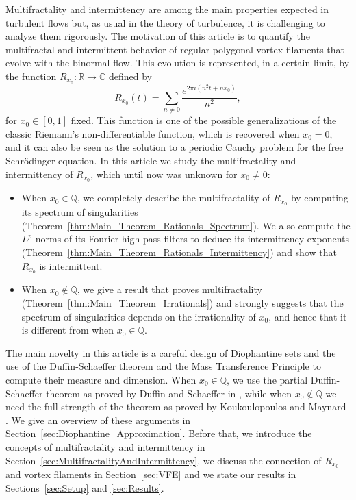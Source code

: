 \documentclass[11pt,reqno]{amsart}
\theoremstyle{definition}
\begin{document}
Multifractality and intermittency are among the main properties expected in turbulent flows
but, as usual in the theory of turbulence, it is challenging to analyze them rigorously. 
The motivation of this article is to quantify the multifractal and intermittent behavior of regular polygonal vortex filaments that evolve with the binormal flow.  
This evolution is represented, in a certain limit, by the function 
$R_{x_0}: \mathbb R \to \mathbb C$ defined by 
\begin{equation}\label{eq:R_x0}
R_{x_0}(t) = \sum_{n \neq 0} \frac{e^{2\pi i ( n^2 t + n x_0 ) }   }{n^2},
\end{equation} 
for $x_0 \in [0,1]$ fixed.
This function is one of the possible generalizations of the classic Riemann's non-differentiable function, 
which is recovered when $x_0 = 0$, 
and it can also be seen as the solution to a periodic Cauchy problem for the free Schr\"odinger equation. 
In this article we study the multifractality and intermittency of $R_{x_0}$, which until now was unknown for $x_0 \neq 0$:
\begin{itemize}
	\item When $x_0 \in \mathbb Q$, 
	 we completely describe the multifractality of $R_{x_0}$ by computing its spectrum of singularities (Theorem~\ref{thm:Main_Theorem_Rationals_Spectrum}).
	 We also compute the $L^p$ norms of its Fourier high-pass filters to deduce its intermittency exponents (Theorem~\ref{thm:Main_Theorem_Rationals_Intermittency}) and show that $R_{x_0}$ is intermittent.
	\item When $x_0 \not\in\mathbb Q$, we give a result that proves multifractality (Theorem~\ref{thm:Main_Theorem_Irrationals}) and strongly suggests that the spectrum of singularities depends on the irrationality of $x_0$, 
	and hence that it is different from when $x_0 \in \mathbb Q$.  
	\end{itemize}
The main novelty in this article is a careful design of Diophantine sets 
and the use of  the Duffin-Schaeffer theorem and the Mass Transference Principle to compute their measure and dimension.
When $x_0 \in \mathbb Q$, we use the partial Duffin-Schaeffer theorem as proved by Duffin and Schaeffer in \cite{DuffinSchaeffer1941}, 
while when $x_0 \not\in\mathbb Q$ we need the full strength of the theorem as proved by Koukoulopoulos and Maynard \cite{KoukoulopoulosMaynard2020}.
We give an overview of these arguments in Section~\ref{sec:Diophantine_Approximation}.
Before that, 
we introduce the concepts of multifractality and intermittency in Section~\ref{sec:MultifractalityAndIntermittency}, 
we discuss the connection of $R_{x_0}$ and vortex filaments in Section~\ref{sec:VFE}
and we state our results in Sections~\ref{sec:Setup} and \ref{sec:Results}.
\end{document}

